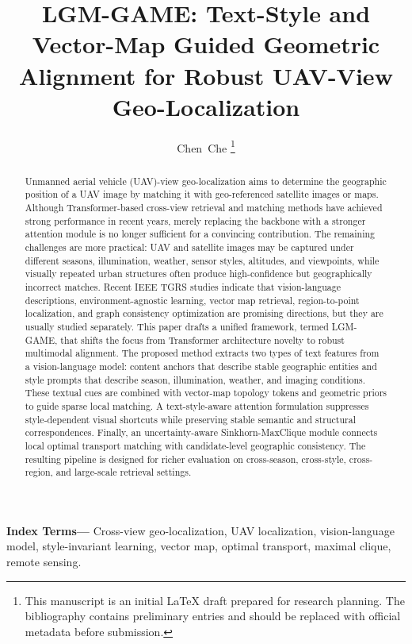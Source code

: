\documentclass[journal]{IEEEtran}
\title{LGM-GAME: Text-Style and Vector-Map Guided Geometric Alignment for Robust UAV-View Geo-Localization}
\author{Chen~Che%
\thanks{This manuscript is an initial LaTeX draft prepared for research planning. The bibliography contains preliminary entries and should be replaced with official metadata before submission.}}
\newenvironment{IEEEkeywords}{\par\noindent\textbf{Index Terms---}}{\par}
\begin{document}
\maketitle

\begin{abstract}
Unmanned aerial vehicle (UAV)-view geo-localization aims to determine the geographic position of a UAV image by matching it with geo-referenced satellite images or maps. Although Transformer-based cross-view retrieval and matching methods have achieved strong performance in recent years, merely replacing the backbone with a stronger attention module is no longer sufficient for a convincing contribution. The remaining challenges are more practical: UAV and satellite images may be captured under different seasons, illumination, weather, sensor styles, altitudes, and viewpoints, while visually repeated urban structures often produce high-confidence but geographically incorrect matches. Recent IEEE TGRS studies indicate that vision-language descriptions, environment-agnostic learning, vector map retrieval, region-to-point localization, and graph consistency optimization are promising directions, but they are usually studied separately. This paper drafts a unified framework, termed LGM-GAME, that shifts the focus from Transformer architecture novelty to robust multimodal alignment. The proposed method extracts two types of text features from a vision-language model: content anchors that describe stable geographic entities and style prompts that describe season, illumination, weather, and imaging conditions. These textual cues are combined with vector-map topology tokens and geometric priors to guide sparse local matching. A text-style-aware attention formulation suppresses style-dependent visual shortcuts while preserving stable semantic and structural correspondences. Finally, an uncertainty-aware Sinkhorn-MaxClique module connects local optimal transport matching with candidate-level geographic consistency. The resulting pipeline is designed for richer evaluation on cross-season, cross-style, cross-region, and large-scale retrieval settings.
\end{abstract}

\begin{IEEEkeywords}
Cross-view geo-localization, UAV localization, vision-language model, style-invariant learning, vector map, optimal transport, maximal clique, remote sensing.
\end{IEEEkeywords}
\end{document}
